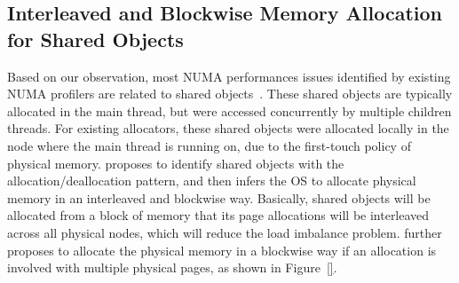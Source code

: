 
\subsection{Interleaved and Blockwise Memory Allocation for Shared Objects} 
\label{sec:mainthread}

Based on our observation, most NUMA performances issues identified by existing NUMA profilers are related to shared objects~\cite{XULIU, MemProf}. These shared objects are typically allocated in the main thread, but were accessed concurrently by multiple children threads. For existing allocators, these shared objects were allocated locally in the node where the main thread is running on, due to the first-touch policy of physical memory. \NA{} proposes to identify shared objects with the allocation/deallocation pattern, and then infers the OS to allocate physical memory in an interleaved and blockwise way. Basically, shared objects will be allocated from a block of memory that its page allocations will be interleaved across all physical nodes, which will reduce the load imbalance problem. \NA{} further proposes to allocate the physical memory in a blockwise way if an allocation is involved with multiple physical pages, as shown in Figure~\ref{}.   
 
  
